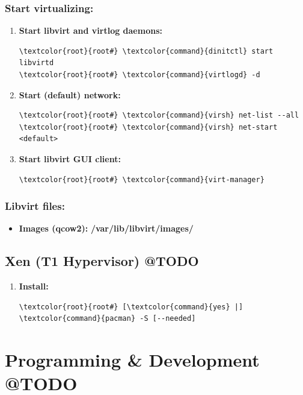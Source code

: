 \documentclass[10pt, a4paper, onecolumn, oneside, titlepage, openany]{book}
\begin{document}
\subsection{Start virtualizing:}
\begin{enumerate}
    \item \textbf{Start libvirt and virtlog daemons:}
\begin{Verbatim}[commandchars=\\\{\}]
\textcolor{root}{root#} \textcolor{command}{dinitctl} start libvirtd
\textcolor{root}{root#} \textcolor{command}{virtlogd} -d
\end{Verbatim}
    \item \textbf{Start (default) network:}
\begin{Verbatim}[commandchars=\\\{\}]
\textcolor{root}{root#} \textcolor{command}{virsh} net-list --all
\textcolor{root}{root#} \textcolor{command}{virsh} net-start <default>
\end{Verbatim}
    \item \textbf{Start libvirt GUI client:}
\begin{Verbatim}[commandchars=\\\{\}]
\textcolor{root}{root#} \textcolor{command}{virt-manager}
\end{Verbatim}
\end{enumerate}
\subsection{Libvirt files:}
\begin{itemize}
    \item \textbf{Images (qcow2):} \textbf{\textcolor{dir}{/var/lib/libvirt/images/}}
\end{itemize}

\section{Xen (T1 Hypervisor) @TODO}
\begin{enumerate}
    \item \textbf{Install:}
\begin{Verbatim}[commandchars=\\\{\}]
\textcolor{root}{root#} [\textcolor{command}{yes} |] \textcolor{command}{pacman} -S [--needed]
\end{Verbatim}
\end{enumerate}


\chapter{Programming \& Development @TODO}
\end{document}
